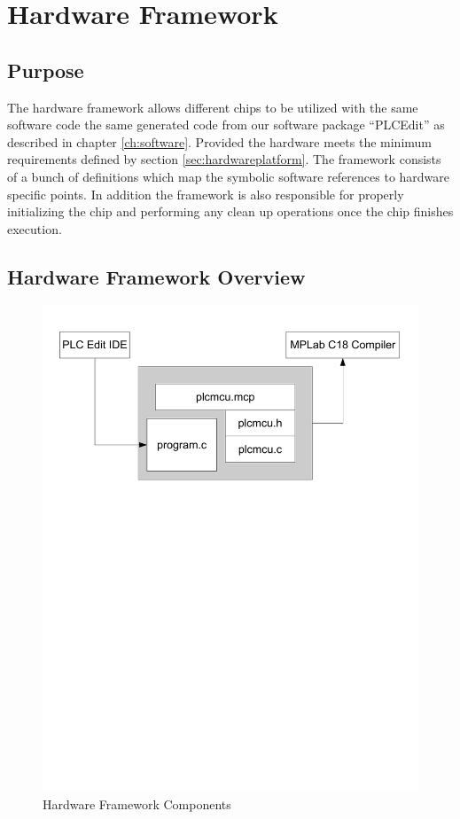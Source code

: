 \section{Hardware Framework}
\label{sec:hardwareframework}

\subsection{Purpose}
The hardware framework allows different chips to be utilized with the same software code the same generated code from our software package ``PLCEdit'' as described in chapter \ref{ch:software}. Provided the hardware meets the minimum requirements defined by section \ref{sec:hardwareplatform}. The framework consists of a bunch of definitions which map the symbolic software references to hardware specific points. In addition the framework is also responsible for properly initializing the chip and performing any clean up operations once the chip finishes execution.


\subsection{Hardware Framework Overview}

\begin{figure}[htp]
    \centering
    \includegraphics[trim= 10mm 150mm 10mm 10mm, clip, width=\imgmedium]{./images/hardwareframework.pdf}
    \caption{Hardware Framework Components}
    \label{fig:hardwareframework}
\end{figure}


